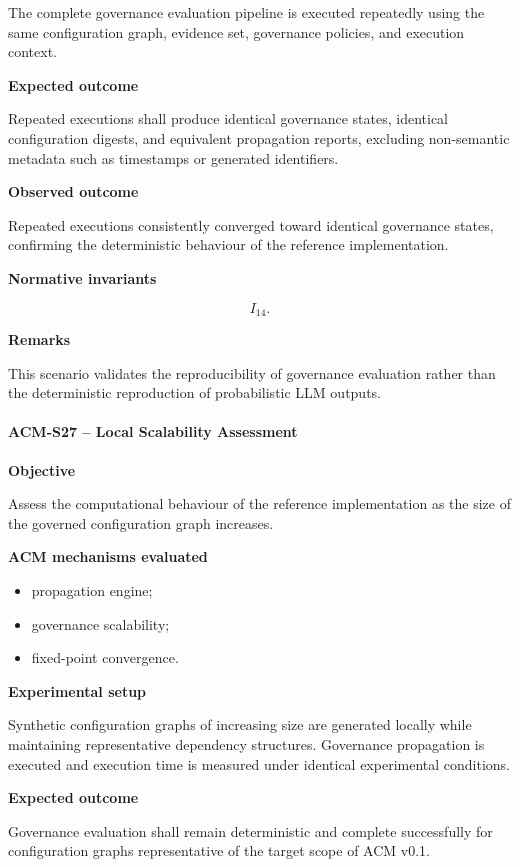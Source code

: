 \documentclass[10pt]{article}
\begin{document}
The complete governance evaluation pipeline is executed repeatedly using the
same configuration graph, evidence set, governance policies, and execution
context.

\textbf{Expected outcome}

Repeated executions shall produce identical governance states, identical
configuration digests, and equivalent propagation reports, excluding
non-semantic metadata such as timestamps or generated identifiers.

\textbf{Observed outcome}

Repeated executions consistently converged toward identical governance states,
confirming the deterministic behaviour of the reference implementation.

\textbf{Normative invariants}

\[
I_{14}.
\]

\textbf{Remarks}

This scenario validates the reproducibility of governance evaluation rather
than the deterministic reproduction of probabilistic LLM outputs.

\paragraph{ACM-S27 -- Local Scalability Assessment}

\textbf{Objective}

Assess the computational behaviour of the reference implementation as the size
of the governed configuration graph increases.

\textbf{ACM mechanisms evaluated}

\begin{itemize}
    \item propagation engine;
    \item governance scalability;
    \item fixed-point convergence.
\end{itemize}

\textbf{Experimental setup}

Synthetic configuration graphs of increasing size are generated locally while
maintaining representative dependency structures. Governance propagation is
executed and execution time is measured under identical experimental
conditions.

\textbf{Expected outcome}

Governance evaluation shall remain deterministic and complete successfully for
configuration graphs representative of the target scope of ACM v0.1.
\end{document}
